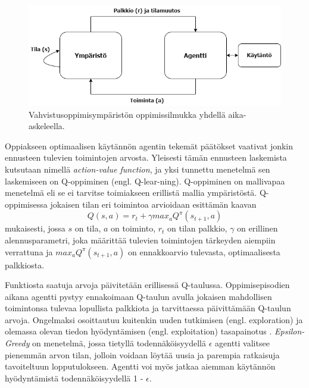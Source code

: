 \documentclass[utf8]{gradu3}
\begin{document}
\begin{figure}[h]
\centering
\includegraphics[width=13.5cm]{reinflearning.png}
\caption{Vahvistusoppimisympäristön oppimissilmukka yhdellä aika-askeleella.}
\label{reinflearning}
\end{figure}

Oppiakseen optimaalisen käytännön agentin tekemät päätökset vaativat jonkin ennusteen tulevien toimintojen arvosta. Yleisesti tämän ennusteen laskemista kutsutaan nimellä \textit{action-value function}, ja yksi tunnettu menetelmä sen laskemiseen on Q-oppiminen (engl. Q-lear-ning). Q-oppiminen on mallivapaa menetelmä eli se ei tarvitse toimiakseen erillistä mallia ympäristöstä. Q-oppimisessa jokaisen tilan eri toimintoa arvioidaan \textcite{arulkumaran2017brief} esittämän kaavan \[Q(s,a) = r_t + \gamma max_a Q^\pi (s_{t+1},a)\] mukaisesti, jossa \(s\) on tila, \(a\) on toiminto, \(r_t\) on tilan palkkio, $\gamma$ on erillinen alennusparametri, joka määrittää tulevien toimintojen tärkeyden aiempiin verrattuna ja \(max_a Q^\pi (s_{t+1},a)\) on ennakkoarvio tulevasta, optimaalisesta palkkiosta.

Funktiosta saatuja arvoja päivitetään erillisessä Q-taulussa. Oppimisepisodien aikana agentti pystyy ennakoimaan Q-taulun avulla jokaisen mahdollisen toimintonsa tulevaa lopullista palkkiota ja tarvittaessa päivittämään Q-taulun arvoja. Ongelmaksi osoittautuu kuitenkin uuden tutkimisen (engl. exploration) ja olemassa olevan tiedon hyödyntämisen (engl. exploitation) tasapainotus \parencite{arulkumaran2017brief}. \textit{Epsilon-Greedy} on menetelmä, jossa tietyllä todennäköisyydellä $\epsilon$ agentti valitsee pienemmän arvon tilan, jolloin voidaan löytää uusia ja parempia ratkaisuja tavoiteltuun lopputulokseen. Agentti voi myös jatkaa aiemman käytännön hyödyntämistä todennäköisyydellä 1 - $\epsilon$.
\end{document}
